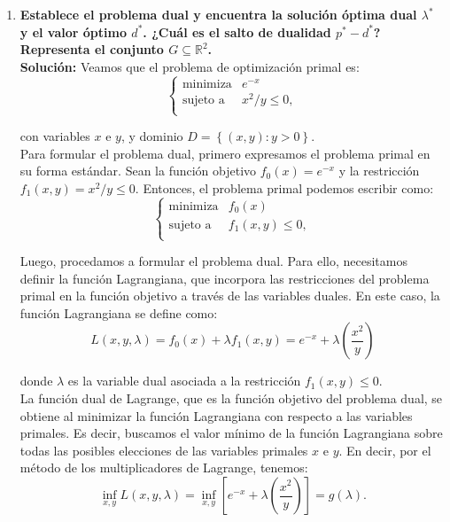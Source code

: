\begin{enumerate}
\begin{enumerate}[\bfseries (a)]
	\item \textbf{\boldmath Establece el problema dual y encuentra la solución óptima dual $\lambda^*$ y el valor óptimo $d^*$. ¿Cuál es el salto de dualidad $p^*-d^*$? Representa el conjunto $G\subseteq \mathbb{R}^2$.}\\

	    \textbf{Solución:} Veamos que el problema de optimización primal es:
	    $$
	    \left\{
		\begin{array}{ll}
			\text{minimiza} & e^{-x}\\
			\text{sujeto a} & x^2/y\leq 0,\\
		\end{array}
	    \right.
	    $$

	    con variables $x$ e $y$, y dominio $D=\left\{(x,y):y>0\right\}$.\\

	    Para formular el problema dual, primero expresamos el problema primal en su forma estándar. Sean la función objetivo $f_0(x) = e^{-x}$ y la restricción $f_1(x,y) = x^2/y \leq 0$. Entonces, el problema primal podemos escribir como:
	    $$
	    \left\{
		\begin{array}{ll}
			\text{minimiza} & f_0(x)\\
			\text{sujeto a} & f_1(x,y) \leq 0,\\
		\end{array}
	    \right.
	    $$

	    Luego, procedamos a formular el problema dual. Para ello, necesitamos definir la función Lagrangiana, que incorpora las restricciones del problema primal en la función objetivo a través de las variables duales. En este caso, la función Lagrangiana se define como:
	    $$
	    L(x,y,\lambda) = f_0(x) + \lambda f_1(x,y) = e^{-x} + \lambda \left(\frac{x^2}{y}\right)
	    $$

	    donde $\lambda$ es la variable dual asociada a la restricción $f_1(x,y) \leq 0$.\\

	    La función dual de Lagrange, que es la función objetivo del problema dual, se obtiene al minimizar la función Lagrangiana con respecto a las variables primales. Es decir, buscamos el valor mínimo de la función Lagrangiana sobre todas las posibles elecciones de las variables primales $x$ e $y$. En decir, por el método de los multiplicadores de Lagrange, tenemos:
	    $$
	     \inf_{x,y} L(x,y,\lambda) = \inf_{x,y} \left[e^{-x} + \lambda \left(\frac{x^2}{y}\right)\right]=g(\lambda).
	    $$


\end{enumerate}
\end{enumerate}

